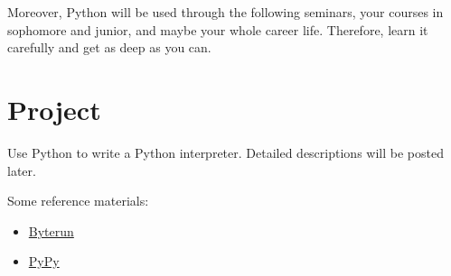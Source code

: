 \documentclass[english]{../TexTemplate/thesis}
\begin{document}
Moreover, Python will be used through the following seminars, your courses in sophomore and junior, and maybe your whole career life.
Therefore, learn it carefully and get as deep as you can.

\section{Project}
Use Python to write a Python interpreter.
Detailed descriptions will be posted later.

Some reference materials:
\begin{itemize}
	\item \href{https://github.com/aosabook/500lines/tree/master/interpreter}{Byterun}
	\item \href{https://pypy.org/}{PyPy}
\end{itemize}

\end{document}
